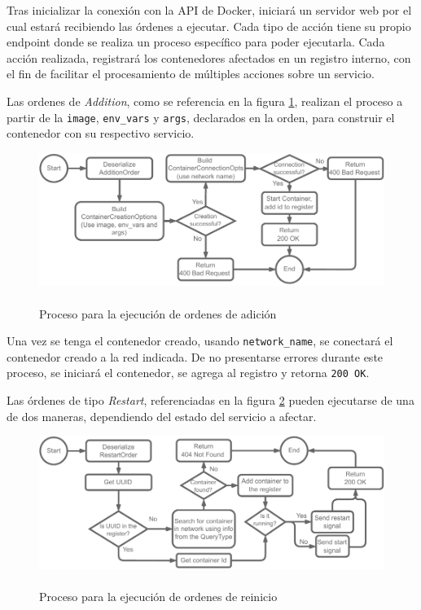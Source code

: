 Tras inicializar la conexión con la API de Docker, iniciará un servidor web por el cual estará recibiendo las órdenes a ejecutar. Cada tipo de acción tiene su propio endpoint donde se realiza un proceso específico para poder ejecutarla. Cada acción realizada, registrará los contenedores afectados en un registro interno, con el fin de facilitar el procesamiento de múltiples acciones sobre un servicio. 

Las ordenes de \textit{Addition}, como se referencia en la figura \ref{fig:DoThingAddition}, realizan el proceso a partir de la \texttt{image}, \texttt{env\_vars} y \texttt{args}, declarados en la orden, para construir el contenedor con su respectivo servicio.

\begin{figure}[ht]
    \centering
    \caption{\\Proceso para la ejecución de ordenes de adición}
    \label{fig:DoThingAddition}
    \includegraphics[width=0.8\linewidth]{images/DoThingAddition.pdf}
\end{figure}

Una vez se tenga el contenedor creado, usando \texttt{network\_name}, se conectará el contenedor creado a la red indicada. De no presentarse errores durante este proceso, se iniciará el contenedor, se agrega al registro y retorna \texttt{200 OK}. 

Las órdenes de tipo \textit{Restart}, referenciadas en la figura \ref{fig:DoThingRestart} pueden ejecutarse de una de dos maneras, dependiendo del estado del servicio a afectar. 

\begin{figure}[ht]
    \centering
    \caption{\\Proceso para la ejecución de ordenes de reinicio}
    \label{fig:DoThingRestart}
    \includegraphics[width=0.9\linewidth]{images/DoThingRestart.pdf}
\end{figure}

